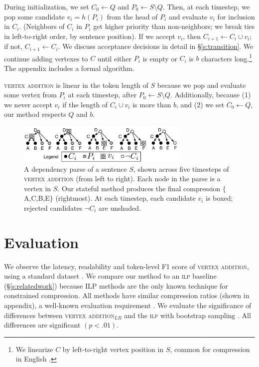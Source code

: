 \documentclass[11pt,a4paper]{article}
\begin{document}
During initialization, we set $C_0 \gets Q$ and $P_0 \gets S \setminus Q$. Then, at each timestep, we pop some candidate $v_i =h(P_i)$ from the head of $P_i$ and evaluate $v_i$ for inclusion in $C_i$. (Neighbors of $C_i$ in $P_i$ get higher priority than non-neighbors; we break ties in left-to-right order, by sentence position). If we accept $v_i$, then $C_{i + 1} \gets C_i \cup v_i$; if not, $C_{i + 1} \gets C_i$. We discuss acceptance decisions in detail in \S\ref{s:transition}. We continue adding vertexes to $C$ until either $P_i$ is empty or $C_i$ is $b$ characters long.\footnote{We linearize $C$ by left-to-right vertex position in $S$, common for compression in English \cite{filippova2013overcoming}.} The appendix includes a formal algorithm. 

\textsc{vertex addition} is linear in the token length of $S$ because we pop and evaluate some vertex from $P_i$ at each timestep, after $P_0  \gets S \setminus Q$. Additionally, because (1) we never accept $v_i$ if the length of $C_i \cup v_i$ is more than $b$, and (2) we set $C_0 \gets Q$, our method respects $Q$ and $b$.

\begin{figure}[h]
\includegraphics[width=8.2cm]{additive.pdf}
\caption{A dependency parse of a sentence $S$, shown across five timesteps of \textsc{vertex addition} (from left to right). Each node in the parse is a vertex in $S$. Our stateful method produces the final compression $\{$A,C,B,E$\}$ (rightmost). At each timestep, each candidate $v_i$ is boxed; rejected candidates $\neg C_i$ are unshaded.}
\label{f:walkthru}
\end{figure}

\section{Evaluation}\label{s:autoeval}

We observe the latency, readability and token-level F1 score of \textsc{vertex addition}, using a standard dataset \cite{filippova2013overcoming}.
We compare our method to an \textsc{ilp} baseline (\S\ref{s:relatedwork}) because ILP methods are the only known technique for constrained compression. All methods have similar compression ratios (shown in appendix), a well-known evaluation requirement \cite{napoles2011evaluating}. We evaluate the significance of differences between \textsc{vertex addition}$_{LR}$ and the \textsc{ilp} with bootstrap sampling \cite{D12-1091}. All differences are significant {\small $(p < .01)$}. 
\end{document}
